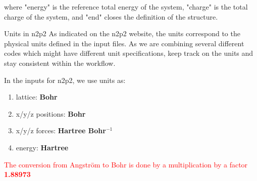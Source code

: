 \documentclass[12pt]{article}
\newcommand\Warning{%
 \makebox[1.4em][c]{%
 \makebox[0pt][c]{\raisebox{.1em}{\small!}}%
 \makebox[0pt][c]{\color{red}\Large$\bigtriangleup$}}}%
\begin{document}
where "energy" is the reference total energy of the system, "charge" is the total charge of the system, and "end" closes the definition of the structure. 

\begin{mybox1}{Units in n2p2}
\Warning As indicated on the n2p2 website, the units correspond to the physical units defined in the input files. As we are combining several different codes which might have different unit specifications, keep track on the units and stay consistent within the workflow.

In the inputs for n2p2, we use units as:
\begin{enumerate}
    \item lattice: \textbf{Bohr}
    \item x/y/z positions: \textbf{Bohr}
    \item x/y/z forces: \textbf{Hartree Bohr$^{-1}$}
    \item energy: \textbf{Hartree}
\end{enumerate}

\textcolor{red}{The conversion from Angström to Bohr is done by a multiplication by a factor \textbf{1.88973}}
\end{mybox1}
\end{document}
